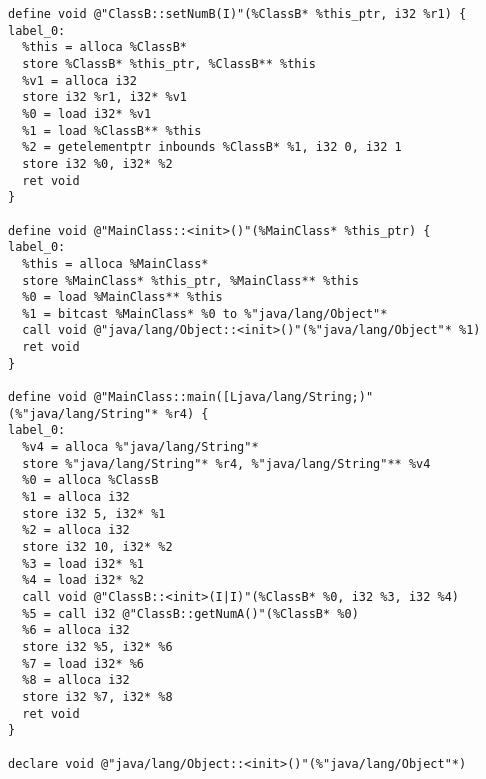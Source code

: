 \begin{lstlisting}[frame=single, title= LLVM IR]
define void @"ClassB::setNumB(I)"(%ClassB* %this_ptr, i32 %r1) {
label_0:
  %this = alloca %ClassB*
  store %ClassB* %this_ptr, %ClassB** %this
  %v1 = alloca i32
  store i32 %r1, i32* %v1
  %0 = load i32* %v1
  %1 = load %ClassB** %this
  %2 = getelementptr inbounds %ClassB* %1, i32 0, i32 1
  store i32 %0, i32* %2
  ret void
}

define void @"MainClass::<init>()"(%MainClass* %this_ptr) {
label_0:
  %this = alloca %MainClass*
  store %MainClass* %this_ptr, %MainClass** %this
  %0 = load %MainClass** %this
  %1 = bitcast %MainClass* %0 to %"java/lang/Object"*
  call void @"java/lang/Object::<init>()"(%"java/lang/Object"* %1)
  ret void
}

define void @"MainClass::main([Ljava/lang/String;)"(%"java/lang/String"* %r4) {
label_0:
  %v4 = alloca %"java/lang/String"*
  store %"java/lang/String"* %r4, %"java/lang/String"** %v4
  %0 = alloca %ClassB
  %1 = alloca i32
  store i32 5, i32* %1
  %2 = alloca i32
  store i32 10, i32* %2
  %3 = load i32* %1
  %4 = load i32* %2
  call void @"ClassB::<init>(I|I)"(%ClassB* %0, i32 %3, i32 %4)
  %5 = call i32 @"ClassB::getNumA()"(%ClassB* %0)
  %6 = alloca i32
  store i32 %5, i32* %6
  %7 = load i32* %6
  %8 = alloca i32
  store i32 %7, i32* %8
  ret void
}

declare void @"java/lang/Object::<init>()"(%"java/lang/Object"*)
\end{lstlisting}
